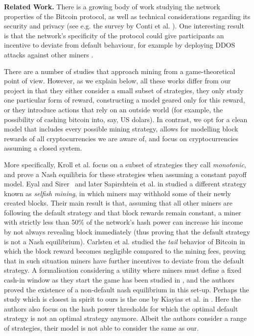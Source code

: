 \smallskip
\noindent
{\bf Related Work.} There is a growing body of work studying the network properties of the Bitcoin protocol, as well as technical considerations regarding its security and privacy (see e.g. the survey by Conti et al. \cite{conti2018survey}). One interesting result is that the network's specificity of the protocol could give participants an incentive to deviate from default behaviour, for example by deploying DDOS attacks against other miners \cite{bitcoin_attacks_2013,ddos_attacks2014,empirical_dos_attacks2014}. 

There are a number of studies that approach mining from a game-theoretical point of view. However, as we explain below, all these works 
differ from our project in that they either consider a small subset of strategies, they only study one particular form of reward, constructing a model geared only for this reward, 
or they introduce actions that rely on an outside world (for example, the possibility of cashing bitcoin into, say, US dolars). In contrast, we opt for a clean model that includes every possible mining strategy, allows for modelling block rewards of all cryptocurrencies we are aware of, and focus on cryptocurrencies assuming a closed system. 

More specifically,  Kroll et al. \cite{economics_of_mining2013} focus on a subset of strategies they call \emph{monotonic}, and prove a 
Nash equilibria for these strategies when assuming a constant payoff model. Eyal and Sirer~\cite{selfishmining2014}  and later Sapirshtein et al. in \cite{optimalselfishmining2017} studied a different strategy known as \emph{selfish mining}, in which miners may withhold some of their newly created blocks. Their main result is that, assuming that all other miners are following the default strategy and that block rewards remain constant, a miner with strictly less than 50\% of the network's hash power can increase his income by not always revealing block immediately (thus proving that the default strategy is not a Nash equilibrium). Carlsten et al. \cite{instabilitywithoutreward:2016} studied the \emph{tail} behavior of Bitcoin in which the block reward becomes negligible compared to the mining fees, proving that in such situation miners have further incentives to deviate from the default strategy. 
A formalisation considering a utility where miners must define a fixed cash-in window as they start the game has been studied in \cite{biais2018blockchain}, and the authors proved the existence of a non-default nash equilibrium in this set-up.
Perhaps the study which is closest in spirit to ours is the one by Kiayias et al. in \cite{mininggames:2016}. %
Here the authors also focus on the hash power thresholds for which the optimal default strategy is not an optimal strategy anymore. Albeit the authors consider a range of strategies, their model is not able to consider the same as our. 

